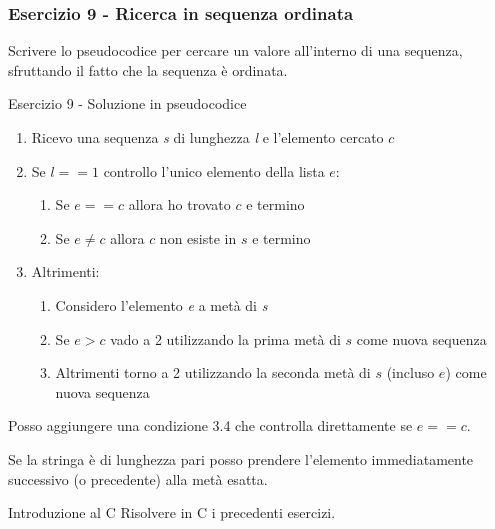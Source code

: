 \documentclass[]{beamer}
\begin{document}
\begin{frame}
\frametitle{Esercizio 9 - Ricerca in sequenza ordinata}
Scrivere lo pseudocodice per cercare un valore all'interno di una sequenza, sfruttando il fatto che la sequenza è ordinata.
\end{frame}

\begin{frame}[allowframebreaks]{Esercizio 9 - Soluzione in pseudocodice}
\begin{enumerate}
	\item Ricevo una sequenza \emph{s} di lunghezza \emph{l} e l'elemento cercato $c$
	\item Se $l == 1$ controllo l'unico elemento della lista $e$:
	\begin{enumerate}
		\item Se $e==c$ allora ho trovato $c$ e termino
		\item Se $e\neq c$ allora $c$ non esiste in $s$ e termino
	\end{enumerate}
	\item Altrimenti:
	\begin{enumerate}
		\item Considero l'elemento \emph{e} a metà di \emph{s}
		\item Se $e > c$ vado a 2 utilizzando la prima metà di $s$ come nuova sequenza
		\item Altrimenti torno a 2 utilizzando la seconda metà di $s$ (incluso $e$) come nuova sequenza
	\end{enumerate}
\end{enumerate}

Posso aggiungere una condizione 3.4 che controlla direttamente se $e == c$.

Se la stringa è di lunghezza pari posso prendere l'elemento immediatamente successivo (o precedente) alla metà esatta.
\end{frame}

\begin{frame}{Introduzione al C}
Risolvere in C i precedenti esercizi.
\end{frame}
\end{document}
